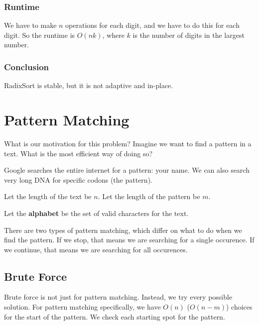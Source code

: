 \documentclass[a4paper]{article}
\begin{document}
\subsubsection{Runtime}

We have to make \( n \) operations for each digit, and we have to do this for each digit. So the runtime is \( O(nk) \), where \( k \) is the number of digits in the largest number. 

\subsubsection{Conclusion}

RadixSort is stable, but it is not adaptive and in-place.


\section{Pattern Matching}

What is our motivation for this problem? Imagine we want to find a pattern in a text. What is the most efficient way of doing so?

\begin{eg}
	Google searches the entire internet for a pattern: your name. We can also search very long DNA for specific codons (the pattern).
\end{eg}

\begin{notation}
	Let the length of the text be \( n \). Let the length of the pattern be \( m \).
\end{notation}

\begin{definition}
	Let the \textbf{alphabet} be the set of valid characters for the text.
\end{definition}

There are two types of pattern matching, which differ on what to do when we find the pattern. If we stop, that means we are searching for a single occurence. If we continue, that means we are searching for all occurences.

\subsection{Brute Force}

Brute force is not just for pattern matching. Instead, we try every possible solution. For pattern matching specifically, we have \( O(n) \) (\( O(n-m) \)) choices for the start of the pattern. We check each starting spot for the pattern.
\end{document}
